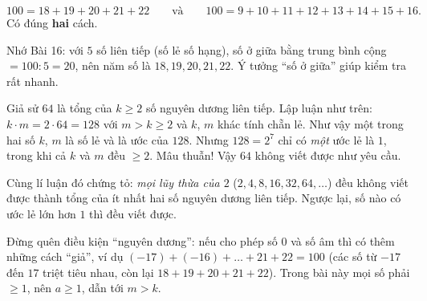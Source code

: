 {
\[100=18+19+20+21+22\qquad\text{và}\qquad 100=9+10+11+12+13+14+15+16.\]
Có đúng \textbf{hai} cách.

\begin{tipbox}Nhớ Bài 16: với $5$ số liên tiếp (số lẻ số hạng), số ở giữa bằng trung bình cộng $=100:5=20$, nên năm số là $18,19,20,21,22$. Ý tưởng ``số ở giữa'' giúp kiểm tra rất nhanh.\end{tipbox}

Giả sử $64$ là tổng của $k\ge 2$ số nguyên dương liên tiếp. Lập luận như trên: $k\cdot m=2\cdot 64=128$ với $m>k\ge 2$ và $k$, $m$ khác tính chẵn lẻ. Như vậy một trong hai số $k$, $m$ là số lẻ và là ước của $128$. Nhưng $128=2^7$ chỉ có \emph{một} ước lẻ là $1$, trong khi cả $k$ và $m$ đều $\ge 2$. Mâu thuẫn! Vậy $64$ không viết được như yêu cầu.

\begin{proofbox}Cùng lí luận đó chứng tỏ: \emph{mọi lũy thừa của $2$} ($2,4,8,16,32,64,\dots$) đều không viết được thành tổng của ít nhất hai số nguyên dương liên tiếp. Ngược lại, số nào có ước lẻ lớn hơn $1$ thì đều viết được.\end{proofbox}

\begin{warnbox}Đừng quên điều kiện ``nguyên dương'': nếu cho phép số $0$ và số âm thì có thêm những cách ``giả'', ví dụ $(-17)+(-16)+\dots+21+22=100$ (các số từ $-17$ đến $17$ triệt tiêu nhau, còn lại $18+19+20+21+22$). Trong bài này mọi số phải $\ge 1$, nên $a\ge 1$, dẫn tới $m>k$.\end{warnbox}

}

